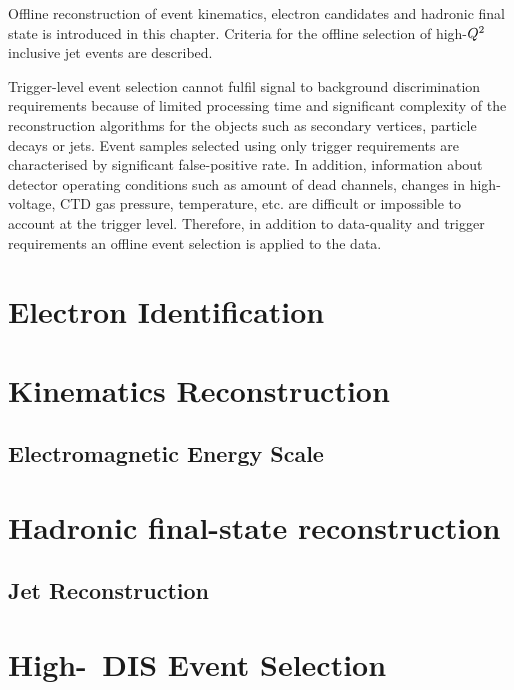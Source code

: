 Offline reconstruction of event kinematics, electron candidates and hadronic final state is introduced in this chapter. Criteria for the offline selection of high-$\mbox{${Q^2}$}$ inclusive jet events are described. 

Trigger-level event selection cannot fulfil signal to background discrimination requirements because of limited processing time and significant complexity of the reconstruction algorithms for the objects such as secondary vertices, particle decays or jets. Event samples selected using only trigger requirements are characterised by significant false-positive rate. In addition, information about detector operating conditions such as amount of dead channels, changes in high-voltage, CTD gas pressure, temperature, etc. are difficult or impossible to account at the trigger level. Therefore, in addition to data-quality and trigger requirements an offline event selection is applied to the data.

\section{Electron Identification}
\label{sec:eleid}


\section{Kinematics Reconstruction}
\label{sec:kinrec}


\subsection{Electromagnetic Energy Scale}
\label{subsec:eleenescale}


\section{Hadronic final-state reconstruction}
\label{sec:hadronreco}


\subsection{Jet Reconstruction}
\label{sec:jetreco}


\section{High-\qsq\, DIS Event Selection}
\label{sec:dissel}

